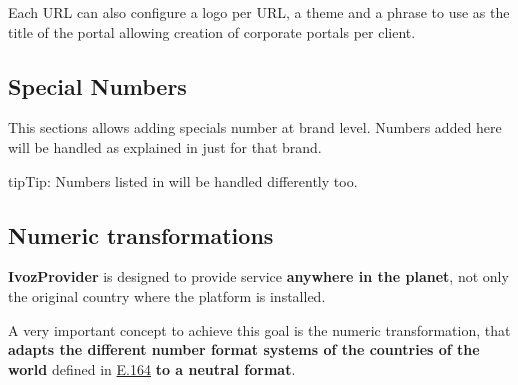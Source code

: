 \documentclass[letterpaper,10pt,english]{sphinxmanual}
\begin{document}
Each URL can also configure a logo per URL, a theme and a phrase to use as
the title of the portal allowing creation of corporate portals per client.


\subsection{Special Numbers}
\label{administration_portal/brand/settings/special_numbers:special-numbers}\label{administration_portal/brand/settings/special_numbers::doc}\label{administration_portal/brand/settings/special_numbers:id1}
This sections allows adding specials number at brand level. Numbers added here will be handled as explained in
{\hyperref[administration_portal/platform/global_special_numbers:global\string-special\string-numbers]{}} just for that brand.

\begin{notice}{tip}{Tip:}
Numbers listed in {\hyperref[administration_portal/platform/global_special_numbers:global\string-special\string-numbers]{}} will be handled differently too.
\end{notice}
\label{administration_portal/brand/settings/numeric_transformations:transformations}\label{administration_portal/brand/settings/numeric_transformations:numeric-transformations}

\subsection{Numeric transformations}
\label{administration_portal/brand/settings/numeric_transformations:transformaciones-numericas}\label{administration_portal/brand/settings/numeric_transformations:id1}\label{administration_portal/brand/settings/numeric_transformations::doc}\label{administration_portal/brand/settings/numeric_transformations:transformations}\label{administration_portal/brand/settings/numeric_transformations:numeric-transformations}
\textbf{IvozProvider} is designed to provide service \textbf{anywhere in the planet}, not
only the original country where the platform is installed.

A very important concept to achieve this goal is the numeric transformation,
that \textbf{adapts the different number format systems of the countries of the world}
defined in \href{https://www.itu.int/rec/T-REC-E.164/es}{E.164} \textbf{to a neutral format}.
\end{document}
